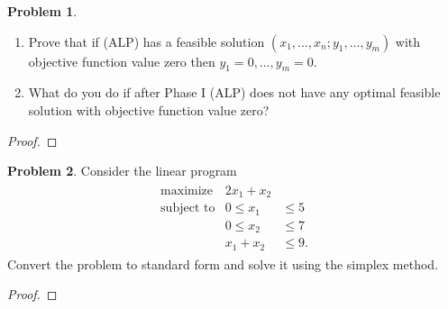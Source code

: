 \documentclass[12pt]{article}
\theoremstyle{definition}
\newtheorem{problem}{Problem}
\begin{document}
\begin{problem}
  \begin{enumerate}
    \item Prove that if (ALP) has a feasible solution $(x_1, \dots, x_n; y_1, \dots, y_m)$
      with objective function value zero then $y_1 = 0, \dots, y_m = 0$.
    \item What do you do if after Phase I (ALP) does not have any optimal feasible
      solution with objective function value zero?
  \end{enumerate}
\end{problem}

\begin{proof}
\end{proof}
\newpage


\begin{problem}
  Consider the linear program
  \begin{align*}
    \begin{array}{rrl}
      \text{maximize} & 2x_1 + x_2 &\\
      \text{subject to} & 0 \leq x_1 &\leq 5 \\
      & 0 \leq x_2 &\leq 7 \\
      & x_1 + x_2 &\leq 9.
    \end{array}
  \end{align*}
  Convert the problem to standard form and solve it using the simplex method.
\end{problem}

\begin{proof}
\end{proof}
\newpage
\end{document}
